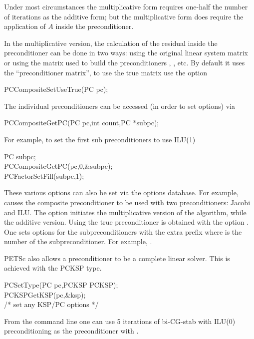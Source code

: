 Under most circumstances the multiplicative form requires one-half the number of
iterations as the additive form; but the multiplicative form does require 
the application of $ A $ inside the preconditioner. 

In the multiplicative version, the calculation of the residual inside the 
preconditioner can be done in two ways: using the original linear system matrix
or using the matrix used to build the preconditioners , , etc.
By default it uses the ``preconditioner matrix'', to use the true matrix use the 
option 
\begin{tabbing}
  PCCompositeSetUseTrue(PC pc);
\end{tabbing}

The individual 
preconditioners can be accessed (in order to set options) via
\begin{tabbing}
  PCCompositeGetPC(PC pc,int count,PC *subpc);
\end{tabbing}
For example, to set the first sub preconditioners to use ILU(1)
\begin{tabbing}
   PC subpc;\\
  PCCompositeGetPC(pc,0,\&subpc);\\
  PCFactorSetFill(subpc,1);
\end{tabbing}

These various options can also be set via the options database. For example,
    
 causes the composite preconditioner to be used with 
two preconditioners: Jacobi and ILU. The option  
 initiates the multiplicative version of the algorithm,
while   the additive version. Using the true
preconditioner is obtained with the option . 
 One sets options for the subpreconditioners with the 
extra prefix  where  is the number of the subpreconditioner.
For example,  .


PETSc also allows a preconditioner to be a complete linear solver. This is 
achieved with the PCKSP type. 
\begin{tabbing}
  PCSetType(PC pc,PCKSP PCKSP);\\
  PCKSPGetKSP(pc,\&ksp);\\
   /* set any KSP/PC options */
\end{tabbing}
From the command line one can use 5 iterations of 
bi-CG-stab with ILU(0) preconditioning as the preconditioner with 
. 

